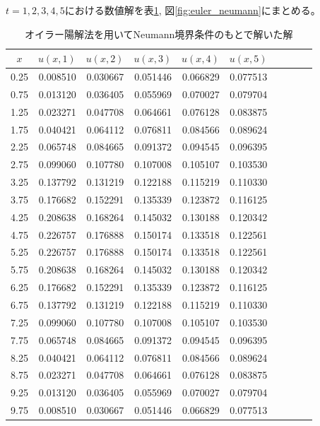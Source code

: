 \documentclass[a4j, titlepage]{jsarticle}
\numberwithin{equation}{section}
\begin{document}
            $t = 1, 2, 3, 4, 5$における数値解を表\ref{tab:euler_neumann}, 図\ref{fig:euler_neumann}にまとめる。
            \begin{table}[h]
                \centering
                \caption{オイラー陽解法を用いてNeumann境界条件のもとで解いた解}
                \label{tab:euler_neumann}
                \begin{tabular}{crrrrcrrrr}
                    \hline
                    $x$ & $u(x, 1)$ & $u(x, 2)$ & $u(x, 3)$ & $u(x, 4)$ & $u(x, 5)$
                    \\
                    \hline
                    \hline
                    0.25 & 0.008510 & 0.030667 & 0.051446 & 0.066829 & 0.077513 \\
                    0.75 & 0.013120 & 0.036405 & 0.055969 & 0.070027 & 0.079704 \\
                    1.25 & 0.023271 & 0.047708 & 0.064661 & 0.076128 & 0.083875 \\
                    1.75 & 0.040421 & 0.064112 & 0.076811 & 0.084566 & 0.089624 \\
                    2.25 & 0.065748 & 0.084665 & 0.091372 & 0.094545 & 0.096395 \\
                    2.75 & 0.099060 & 0.107780 & 0.107008 & 0.105107 & 0.103530 \\
                    3.25 & 0.137792 & 0.131219 & 0.122188 & 0.115219 & 0.110330 \\
                    3.75 & 0.176682 & 0.152291 & 0.135339 & 0.123872 & 0.116125 \\
                    4.25 & 0.208638 & 0.168264 & 0.145032 & 0.130188 & 0.120342 \\
                    4.75 & 0.226757 & 0.176888 & 0.150174 & 0.133518 & 0.122561 \\
                    5.25 & 0.226757 & 0.176888 & 0.150174 & 0.133518 & 0.122561 \\
                    5.75 & 0.208638 & 0.168264 & 0.145032 & 0.130188 & 0.120342 \\
                    6.25 & 0.176682 & 0.152291 & 0.135339 & 0.123872 & 0.116125 \\
                    6.75 & 0.137792 & 0.131219 & 0.122188 & 0.115219 & 0.110330 \\
                    7.25 & 0.099060 & 0.107780 & 0.107008 & 0.105107 & 0.103530 \\
                    7.75 & 0.065748 & 0.084665 & 0.091372 & 0.094545 & 0.096395 \\
                    8.25 & 0.040421 & 0.064112 & 0.076811 & 0.084566 & 0.089624 \\
                    8.75 & 0.023271 & 0.047708 & 0.064661 & 0.076128 & 0.083875 \\
                    9.25 & 0.013120 & 0.036405 & 0.055969 & 0.070027 & 0.079704 \\
                    9.75 & 0.008510 & 0.030667 & 0.051446 & 0.066829 & 0.077513 \\
                    \hline																	
                \end{tabular}
            \end{table}
\end{document}
